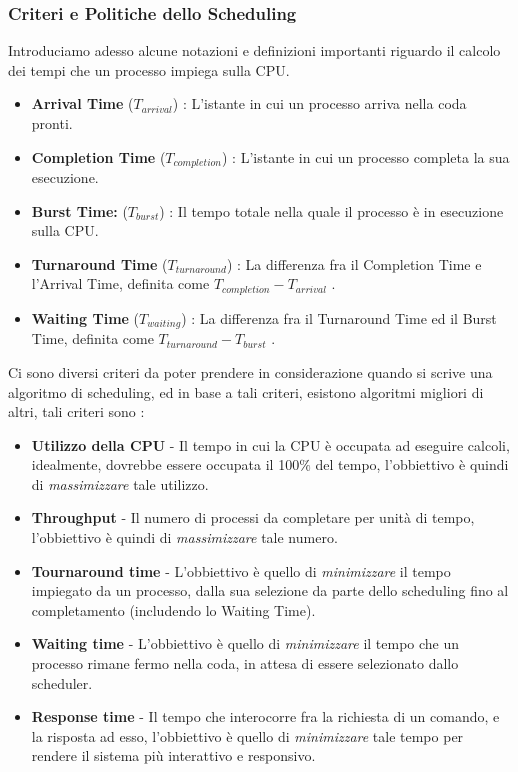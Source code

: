 \documentclass[12pt, letterpaper]{article}
\begin{document}
\subsubsection{Criteri e Politiche dello Scheduling}
Introduciamo adesso alcune notazioni e definizioni importanti riguardo il calcolo dei tempi che un processo 
impiega sulla CPU.\begin{itemize}
    \item \textbf{Arrival Time} (\(T_{arrival}\)) : L'istante in cui un processo arriva nella coda pronti.
    \item \textbf{Completion Time}  (\(T_{completion}\)) : L'istante in cui un processo completa la sua esecuzione.
    \item \textbf{Burst Time:}  (\(T_{burst}\)) : Il tempo totale nella quale il processo è in esecuzione sulla CPU.
    \item \textbf{ Turnaround Time} (\(T_{turnaround}\))  : La differenza fra il Completion Time e l'Arrival Time, definita 
    come \(T_{completion}-T_{arrival}\) .
    \item \textbf{ Waiting Time} (\(T_{waiting}\)) : La differenza fra il Turnaround Time ed il Burst Time, definita 
    come \(T_{turnaround}-T_{burst}\) .
\end{itemize}
Ci sono diversi criteri da poter prendere in considerazione quando si scrive una algoritmo di scheduling, ed in 
base a tali criteri, esistono algoritmi migliori di altri, tali criteri sono :\begin{itemize}
    \item \textbf{Utilizzo della CPU} - Il tempo in cui la CPU è occupata ad eseguire calcoli, idealmente, dovrebbe 
    essere occupata il 100\(\%\) del tempo, l'obbiettivo è quindi di \textit{massimizzare} tale utilizzo.
    \item \textbf{Throughput} - Il numero di processi da completare per unità di tempo, l'obbiettivo è quindi di \textit{massimizzare} tale numero.
    \item \textbf{Tournaround time} - L'obbiettivo è quello di \textit{minimizzare} il tempo impiegato da un processo, 
    dalla sua selezione da parte dello scheduling fino al completamento (includendo lo Waiting Time).
    \item \textbf{Waiting time} - L'obbiettivo è quello di \textit{minimizzare} il tempo che un processo 
    rimane fermo nella coda, in attesa di essere selezionato dallo scheduler.
    \item \textbf{Response time} - Il tempo che interocorre fra la richiesta di un comando, e la risposta ad esso, l'obbiettivo 
    è quello di \textit{minimizzare} tale tempo per rendere il sistema più interattivo e responsivo.
\end{itemize}
\end{document}
